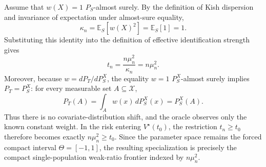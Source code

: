 Assume that \(w(X)=1\) \(P_S\)-almost surely. By the definition of Kish dispersion and invariance of expectation under almost-sure equality,
\[
\kappa_n=\mathbb E_S[w(X)^2]=\mathbb E_S[1]=1.
\]
Substituting this identity into the definition of effective identification strength gives
\[
t_n=\frac{n\mu_n^2}{\kappa_n}=n\mu_n^2.
\]
Moreover, because \(w=dP_T/dP_S^X\), the equality \(w=1\) \(P_S^X\)-almost surely implies \(P_T=P_S^X\): for every measurable set \(A\subseteq\mathcal X\),
\[
P_T(A)=\int_A w(x)\,dP_S^X(x)=P_S^X(A).
\]
Thus there is no covariate-distribution shift, and the oracle observes only the known constant weight. In the risk entering \(V^\star(t_0)\), the restriction \(t_n\ge t_0\) therefore becomes exactly \(n\mu_n^2\ge t_0\). Since the parameter space remains the forced compact interval \(\Theta=[-1,1]\), the resulting specialization is precisely the compact single-population weak-ratio frontier indexed by \(n\mu_n^2\).